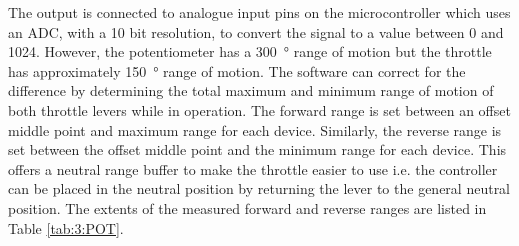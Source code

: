 		The output is connected to analogue input pins on the microcontroller which uses an ADC, with a 10 bit resolution, to convert the signal to a value between 0 and 1024. However, the potentiometer has a \SI{300}{\degree} range of motion but the throttle has approximately \SI{150}{\degree} range of motion. The software can  correct for the difference by determining the total maximum and minimum range of motion of both throttle levers while in operation. The forward range is set between an offset middle point and maximum range for each device. Similarly, the reverse range is set between the offset middle point and the minimum range for each device.  This offers a neutral range buffer to make the throttle easier to use i.e. the controller can be placed in the neutral position by returning the lever to the general neutral position. The extents of the measured forward and reverse ranges are listed in Table \ref{tab:3:POT}.
